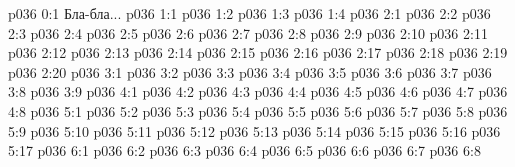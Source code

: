 \author{Сын-Ворондадек}
\vs p036 0:1  Бла-бла...
\vs p036 1:1 
\vs p036 1:2 
\vs p036 1:3 
\vs p036 1:4 
\vs p036 2:1 
\vs p036 2:2 
\vs p036 2:3 
\vs p036 2:4 
\vs p036 2:5 
\vs p036 2:6 
\vs p036 2:7 
\vs p036 2:8 
\vs p036 2:9 \pc 
\vs p036 2:10 \pc 
\vs p036 2:11 
\vs p036 2:12 \pc 
\vs p036 2:13 
\vs p036 2:14 
\vs p036 2:15 
\vs p036 2:16 \pc 
\vs p036 2:17 \pc 
\vs p036 2:18 \pc 
\vs p036 2:19 \pc 
\vs p036 2:20 \pc 
{}
\vs p036 3:1 
\vs p036 3:2 
\vs p036 3:3 
\vs p036 3:4 \pc 
\vs p036 3:5 \pc 
\vs p036 3:6 \pc 
\vs p036 3:7 
\vs p036 3:8 
\vs p036 3:9 
\vs p036 4:1 
\vs p036 4:2 
\vs p036 4:3 
\vs p036 4:4 
\vs p036 4:5 \pc 
\vs p036 4:6 
\vs p036 4:7 
\vs p036 4:8 \pc 
{}
\vs p036 5:1 
\vs p036 5:2 
\vs p036 5:3 
\vs p036 5:4 \pc 
\vs p036 5:5 
\vs p036 5:6 
\vs p036 5:7 
\vs p036 5:8 
\vs p036 5:9 
\vs p036 5:10 
\vs p036 5:11 
\vs p036 5:12 
\vs p036 5:13 \pc 
\vs p036 5:14 
\vs p036 5:15 
\vs p036 5:16 
\vs p036 5:17 \pc 
{}
\vs p036 6:1 
\vs p036 6:2 
\vs p036 6:3 
\vs p036 6:4 \pc 
\vs p036 6:5 
\vs p036 6:6 \pc 
\vs p036 6:7 \pc 
\vsetoff
\vs p036 6:8 
\quizlink
